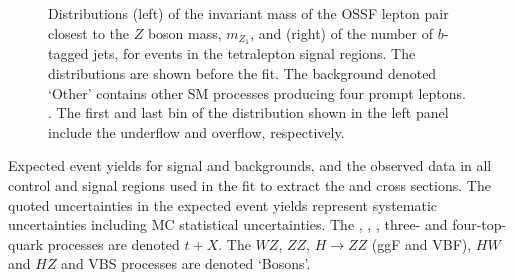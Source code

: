 \begin{figure}[htbp]
\caption{\label{fig:SR4l} Distributions (left) of the invariant mass of the
OSSF lepton pair closest to the $Z$ boson mass, $m_{Z_1}$, and (right) of the
number of $b$-tagged jets, for events in the tetralepton signal regions.  The
distributions are shown before the fit.  The background denoted `Other'
contains other SM processes producing four prompt leptons.  \hatch.  The first
and last bin of the distribution shown in the left panel include the underflow
and overflow, respectively.} 
\end{figure}

\begin{table}[htbp]
\centering \renewcommand{\arraystretch}{1.2}
\caption{\label{tab:yields} Expected event yields for signal and backgrounds,
and the observed data in all control and signal regions used in the fit to
extract the \ttZ and \ttW cross sections.  The quoted uncertainties in the expected
event yields represent systematic uncertainties including MC statistical
uncertainties.  The \tZ, \WtZ, \ttH, three- and four-top-quark processes are
denoted $t+X$. The $WZ$, $ZZ$, $H \to ZZ$ (ggF and VBF), $HW$ and $HZ$ and VBS
processes are denoted `Bosons'.
\vspace{1ex}}


\end{table}
